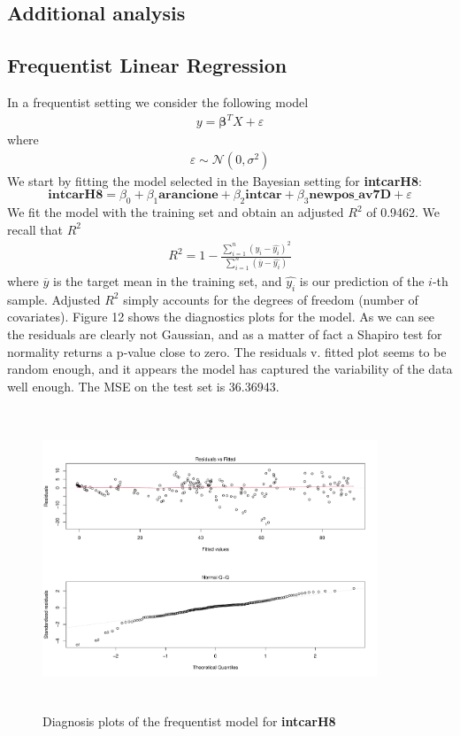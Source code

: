 \documentclass[12pt,a4paper]{article}
\theoremstyle{definition}
\theoremstyle{remark}
\begin{document}
\begin{appendices}
	\section{Additional analysis}
	\subsection{Frequentist Linear Regression}
	In a frequentist setting we consider the following model 
	\begin{align*}
		y = \boldsymbol{\beta}^TX + \varepsilon
	\end{align*}
	where 
	\begin{align*}
		\varepsilon \sim \mathcal{N}(0, \sigma^2)
	\end{align*}
	We start by fitting the model selected in the Bayesian setting for \textbf{intcarH8}:
	\begin{dmath*}
		\textbf{intcarH8} = \beta_0 + \beta_1\textbf{arancione} +  \beta_2\textbf{intcar} + \beta_3\textbf{newpos\_av7D} + \varepsilon
	\end{dmath*}
	We fit the model with the training set and obtain an adjusted $R^2$ of 0.9462. We recall that $R^2$
	\begin{align*}
		R^2 = 1 - \frac{\sum_{i=1}^{n}(y_i-\hat{y_i})^2}{\sum_{i=1}^{n}(\overline{y}-\hat{y_i})}
	\end{align*}
	where $\overline{y}$ is the target mean in the training set, and $\hat{y_i}$  is our prediction of the $i$-th sample. Adjusted $R^2$ simply accounts for the degrees of freedom (number of covariates).  Figure 12 shows the diagnostics plots for the model. As we can see the residuals are clearly not Gaussian, and as a matter of fact a Shapiro test for normality returns a p-value close to zero. The residuals v. fitted plot seems to be random enough, and it appears the model has captured the variability of the data well enough. The MSE on the test set is 36.36943.
	
	\begin{figure}[htb!]
		\centering
		\includegraphics[width=100mm, height=90mm,scale=0.5]{diagnostics1.pdf}
		\caption{Diagnosis plots of the frequentist model for \textbf{intcarH8}}
	\end{figure}
	

\end{appendices}
\end{document}

